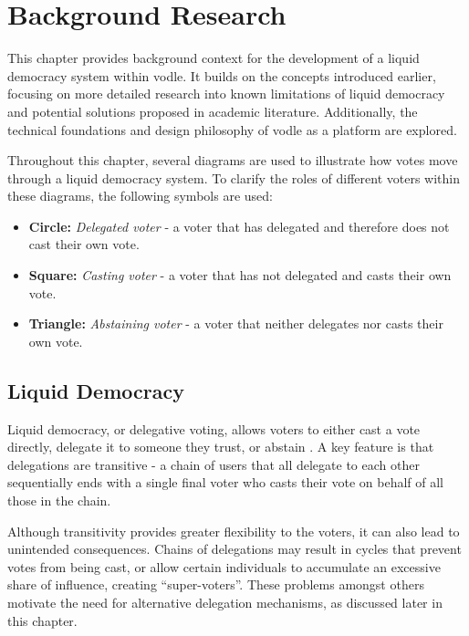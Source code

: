 \chapter{Background Research}\label{ch:background}

This chapter provides background context for the development of a liquid democracy system within vodle. It builds on the concepts introduced earlier, focusing on more detailed research into known limitations of liquid democracy and potential solutions proposed in academic literature. Additionally, the technical foundations and design philosophy of vodle as a platform are explored.

Throughout this chapter, several diagrams are used to illustrate how votes move through a liquid democracy system. To clarify the roles of different voters within these diagrams, the following symbols are used:
\begin{itemize}
    \item \textbf{Circle: } \textit{Delegated voter} - a voter that has delegated and therefore does not cast their own vote.
    \item \textbf{Square: } \textit{Casting voter} - a voter that has not delegated and casts their own vote.
    \item \textbf{Triangle: } \textit{Abstaining voter} - a voter that neither delegates nor casts their own vote.
\end{itemize}

\section{Liquid Democracy}

Liquid democracy, or delegative voting, allows voters to either cast a vote directly, delegate it to someone they trust, or abstain \citep{blum_liquid_2016}. A key feature is that delegations are transitive - a chain of users that all delegate to each other sequentially ends with a single final voter who casts their vote on behalf of all those in the chain.

Although transitivity provides greater flexibility to the voters, 
it can also lead to unintended consequences. Chains of delegations may result in cycles that prevent votes from being cast, or allow certain individuals to accumulate an excessive share of influence, creating ``super-voters''. These problems amongst others motivate the need for alternative delegation mechanisms, as discussed later in this chapter.

